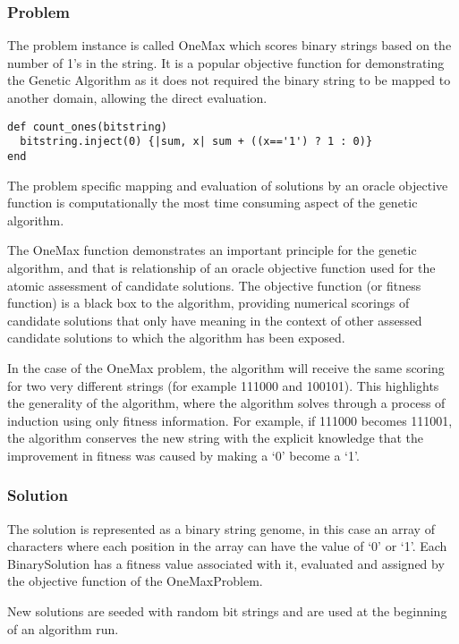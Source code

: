 \subsubsection{Problem}
The problem instance is called OneMax which scores binary strings based on the number of 1's in the string. It is a popular objective function for demonstrating the Genetic Algorithm as it does not required the binary string to be mapped to another domain, allowing the direct evaluation. 

\begin{lstlisting}
def count_ones(bitstring)
  bitstring.inject(0) {|sum, x| sum + ((x=='1') ? 1 : 0)}
end
\end{lstlisting}

The problem specific mapping and evaluation of solutions by an oracle objective function is computationally the most time consuming aspect of the genetic algorithm.

The OneMax function demonstrates an important principle for the genetic algorithm, and that is relationship of an oracle objective function used for the atomic assessment of candidate solutions. The objective function (or fitness function) is a black box to the algorithm, providing numerical scorings of candidate solutions that only have meaning in the context of other assessed candidate solutions to which the algorithm has been exposed.

In the case of the OneMax problem, the algorithm will receive the same scoring for two very different strings (for example 111000 and 100101). This highlights the generality of the algorithm, where the algorithm solves through a process of induction using only fitness information. For example, if 111000 becomes 111001, the algorithm conserves the new string with the explicit knowledge that the improvement in fitness was caused by making a `0' become a `1'. 

\subsubsection{Solution}
The solution is represented as a binary string genome, in this case an array of characters where each position in the array can have the value of `0' or `1'. Each BinarySolution has a fitness value associated with it, evaluated and assigned by the objective function of the OneMaxProblem.

New solutions are seeded with random bit strings and are used at the beginning of an algorithm run. 


